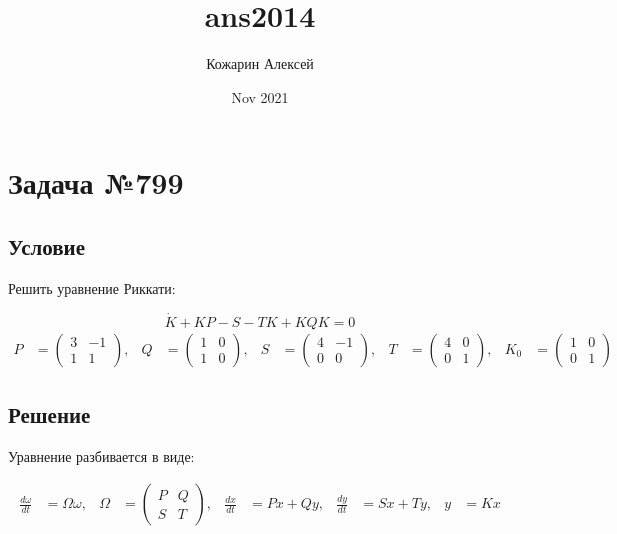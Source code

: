 \documentclass[a4paper,12pt]{article}
\title{ans2014}
\author{Кожарин Алексей}
\date{Nov 2021}
\begin{document}
	
\section{Задача №799}

    \subsection{Условие}
    Решить уравнение Риккати:

    \begin{equation}
        \label{eq:main_problem}
        \dot{K} + KP - S - TK + KQK = 0
    \end{equation}
    \begin{align*}
        P &= \begin{pmatrix}
            3 & -1 \\
            1 & 1
        \end{pmatrix}
        ,& Q &= \begin{pmatrix}
             1 & 0 \\
             1 & 0
        \end{pmatrix}
        ,& S &= \begin{pmatrix}
              4 & -1 \\
              0 & 0
        \end{pmatrix}
        ,& T &= \begin{pmatrix}
               4 & 0 \\
               0 & 1
        \end{pmatrix}
        ,& K_0 &= \begin{pmatrix}
                1 & 0 \\
                0 & 1
        \end{pmatrix}
    \end{align*}

    \subsection{Решение}
    Уравнение разбивается в виде:

    \begin{equation}
        \label{eq:solution_scheme}
        \begin{aligned}
            \frac{d\omega}{dt} &= \Omega \omega ,&
            \Omega &= \begin{pmatrix}
                P & Q \\
                S & T
            \end{pmatrix} ,&
            \frac{dx}{dt} &= Px + Qy ,&
            \frac{dy}{dt} &= Sx + Ty ,&
            y &= Kx
        \end{aligned}
    \end{equation}
\end{document}
